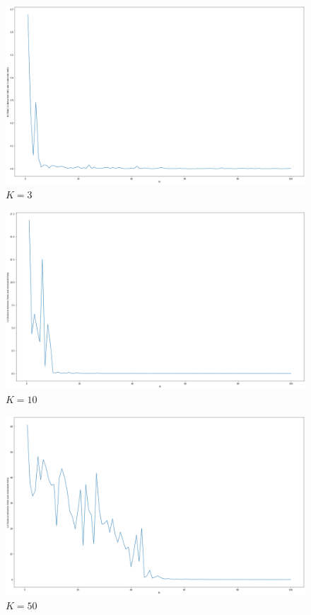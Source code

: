 \documentclass{article}
\begin{document}
\begin{figure}[H]
  \includegraphics[width=\linewidth]{images/k-3.png}
  \caption{$K=3$}
\end{figure}
\begin{figure}[H]
  \includegraphics[width=\linewidth]{images/k-10.png}
  \caption{$K=10$}
\end{figure}
\begin{figure}[H]
  \includegraphics[width=\linewidth]{images/k-50.png}
  \caption{$K=50$}
\end{figure}
\end{document}
